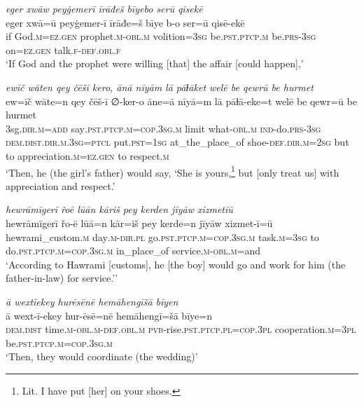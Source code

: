 \ea \label{RE.9}
\textit{eger xwāw peyġemerī īrāđeš bīyebo serū qisekē} \\ 
\gll eger xwā=ū peyġemer-ī īrāđe=š bīye b-o ser=ū qisē-ekē \\ 
 if God\textsc{.m}\textsc{\textsc{=ez.gen}} prophet\textsc{.m}\textsc{-obl}\textsc{.m} volition\textsc{=3sg} be\textsc{.pst}\textsc{.ptcp}\textsc{.m} be\textsc{.prs}\textsc{-3sg} on\textsc{\textsc{=ez.gen}} talk\textsc{.f}\textsc{-def}\textsc{.obl}\textsc{.f} \\ 
\glt `If God and the prophet were willing [that] the affair [could happen],'
\z 
 
\ea \label{RE.10}
\textit{ewīč wāten qey čēšī kero, ānā nīyām lā pāɫāket welē be qewrū be hurmet} \\ 
\gll ew=īč wāte=n qey čēš-ī ∅-ker-o āne=ā nīyā=m lā pāɫā-eke=t welē be qewr=ū be hurmet \\ 
 3sg\textsc{.dir}\textsc{.m}\textsc{=add} say\textsc{.pst}\textsc{.ptcp}\textsc{.m}\textsc{=cop}\textsc{.3sg}\textsc{.m} limit what\textsc{-obl}\textsc{.m} \textsc{ind-}do\textsc{.prs}\textsc{-3sg} \textsc{dem.dist}\textsc{.dir}\textsc{.m}\textsc{.3sg}=\textsc{ptcl} put\textsc{.pst}\textsc{=\textsc{1sg}} at\_the\_place\_of shoe\textsc{-def}\textsc{.dir}\textsc{.m}\textsc{=\textsc{2sg}} but to appreciation\textsc{.m}\textsc{\textsc{=ez.gen}} to respect\textsc{.m} \\ 
\glt `Then, he (the girl’s father) would say, ‘She is yours,\footnote{Lit. I have put [her] on your shoes.} but [only treat us] with appreciation and respect.'
\z 
 
\ea \label{RE.12}
\textit{hewrāmīgerī řoē lūān kāriš pey kerden jīyāw xizmetīū} \\ 
\gll hewrāmīgerī řo-ē lūā=n kār=iš pey kerde=n jīyāw xizmet-ī=ū \\ 
 hewrami\_custom\textsc{.m} day\textsc{.m}\textsc{-dir}\textsc{.pl} go\textsc{.pst}\textsc{.ptcp}\textsc{.m}\textsc{=cop}\textsc{.3sg}\textsc{.m} task\textsc{.m}\textsc{=3sg} to do\textsc{.pst}\textsc{.ptcp}\textsc{.m}\textsc{=cop}\textsc{.3sg}\textsc{.m} in\_place\_of service\textsc{.m}\textsc{-obl}\textsc{.m}=and \\ 
\glt `According to Hawrami [customs], he [the boy] would go and work for him (the father-in-law) for service.’'
\z 
 
\ea \label{RE.14}
\textit{ā wextīekey hurēsēnē hemāhengīšā bīyen} \\ 
\gll ā wext-ī-ekey hur-ēsē=nē hemāhengī=šā bīye=n \\ 
 \textsc{dem.dist} time\textsc{.m}\textsc{-obl}\textsc{.m}\textsc{-def}\textsc{.obl}\textsc{.m} \textsc{pvb-}rise\textsc{.pst}\textsc{.ptcp}\textsc{.pl}\textsc{=cop}\textsc{.3pl} cooperation\textsc{.m}\textsc{=3pl} be\textsc{.pst}\textsc{.ptcp}\textsc{.m}\textsc{=cop}\textsc{.3sg}\textsc{.m} \\ 
\glt `Then, they would coordinate (the wedding)'
\z 
 
